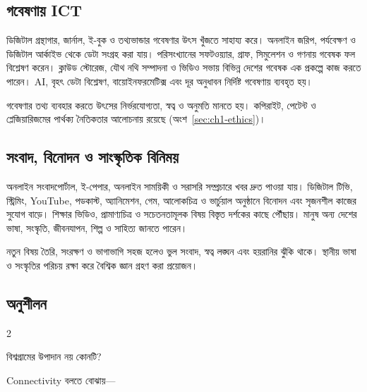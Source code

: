 \begin{topicbody}
\subsection{গবেষণায় ICT}
ডিজিটাল গ্রন্থাগার, জার্নাল, ই-বুক ও তথ্যভান্ডার গবেষণার উৎস খুঁজতে সাহায্য করে। অনলাইন জরিপ, পর্যবেক্ষণ ও ডিজিটাল আর্কাইভ থেকে ডেটা সংগ্রহ করা যায়। পরিসংখ্যানের সফটওয়্যার, গ্রাফ, সিমুলেশন ও গণনায় গবেষক ফল বিশ্লেষণ করেন। ক্লাউড স্টোরেজ, যৌথ নথি সম্পাদনা ও ভিডিও সভায় বিভিন্ন দেশের গবেষক এক প্রকল্পে কাজ করতে পারেন। AI, বৃহৎ ডেটা বিশ্লেষণ, বায়োইনফরমেটিক্স এবং দূর অনুধাবন নির্দিষ্ট গবেষণায় ব্যবহৃত হয়।

গবেষণার তথ্য ব্যবহার করতে উৎসের নির্ভরযোগ্যতা, স্বত্ব ও অনুমতি মানতে হয়। কপিরাইট, পেটেন্ট ও প্লেজিয়ারিজমের পার্থক্য নৈতিকতার আলোচনায় রয়েছে (অংশ~\ref{sec:ch1-ethics})।

\subsection{সংবাদ, বিনোদন ও সাংস্কৃতিক বিনিময়}
অনলাইন সংবাদপোর্টাল, ই-পেপার, অনলাইন সাময়িকী ও সরাসরি সম্প্রচারে খবর দ্রুত পাওয়া যায়। ডিজিটাল টিভি, স্ট্রিমিং, YouTube, পডকাস্ট, অ্যানিমেশন, গেম, আলোকচিত্র ও ভার্চুয়াল অনুষ্ঠানে বিনোদন এবং সৃজনশীল কাজের সুযোগ বাড়ে। শিক্ষার ভিডিও, প্রামাণ্যচিত্র ও সচেতনতামূলক বিষয় বিস্তৃত দর্শকের কাছে পৌঁছায়। মানুষ অন্য দেশের ভাষা, সংস্কৃতি, জীবনযাপন, শিল্প ও সাহিত্য জানতে পারেন।

নতুন বিষয় তৈরি, সংরক্ষণ ও ভাগাভাগি সহজ হলেও ভুল সংবাদ, স্বত্ব লঙ্ঘন এবং হয়রানির ঝুঁকি থাকে। স্থানীয় ভাষা ও সংস্কৃতির পরিচয় রক্ষা করে বৈশ্বিক জ্ঞান গ্রহণ করা প্রয়োজন।

\subsection{অনুশীলন}

\begin{multicols}{2}\begin{compactenum}
\item \begin{minipage}[t]{\linewidth}বিশ্বগ্রামের উপাদান নয় কোনটি?\par {}\par\end{minipage}

\item \begin{minipage}[t]{\linewidth}Connectivity বলতে বোঝায়—\par {}\par\end{minipage}


\end{compactenum}
\end{multicols}
\end{topicbody}
